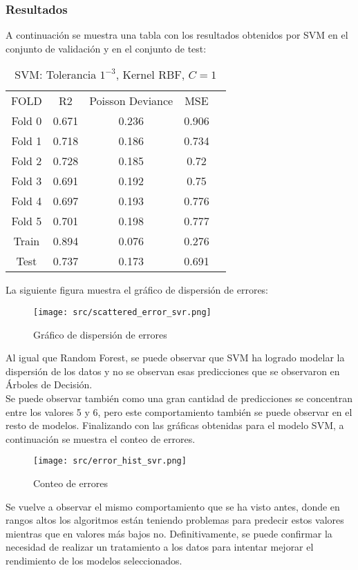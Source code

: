 \subsubsection*{Resultados}
A continuación se muestra una tabla con los resultados obtenidos por SVM en el conjunto de validación y en el conjunto de test:
\begin{table}[H]
	\centering
	\begin{tabular}{|c|c|c|c|c}
		\cline{1-4}
		FOLD   & R2    & Poisson Deviance & MSE   \\ \cline{1-4}
		Fold 0 & 0.671 & 0.236            & 0.906 \\ \cline{1-4}
		Fold 1 & 0.718 & 0.186            & 0.734 \\ \cline{1-4}
		Fold 2 & 0.728 & 0.185            & 0.72  \\ \cline{1-4}
		Fold 3 & 0.691 & 0.192            & 0.75  \\ \cline{1-4}
		Fold 4 & 0.697 & 0.193            & 0.776 \\ \cline{1-4}
		Fold 5 & 0.701 & 0.198            & 0.777 \\ \cline{1-4}
		Train  & 0.894 & 0.076            & 0.276 \\ \cline{1-4}
		Test   & 0.737 & 0.173            & 0.691 \\ \cline{1-4}
	\end{tabular}
	\caption{SVM: Tolerancia $1^{-3}$, Kernel RBF, $C=1$}
	\label{tab:svm_res}
\end{table}
\clearpage
La siguiente figura muestra el gráfico de dispersión de errores:
\begin{figure}[H]
	\centering
	\texttt{[image: src/scattered\_error\_svr.png]}
	\caption{Gráfico de dispersión de errores}
	\label{fig:svr_scattered}
\end{figure}
Al igual que Random Forest, se puede observar que SVM ha logrado modelar la dispersión de los datos y no se observan esas predicciones que se observaron en Árboles de Decisión.\\
Se puede observar también como una gran cantidad de predicciones se concentran entre los valores 5 y 6, pero este comportamiento también se puede observar en el resto de modelos. 
\clearpage
Finalizando con las gráficas obtenidas para el modelo SVM, a continuación se muestra el conteo de errores.
\begin{figure}[H]
	\centering
	\texttt{[image: src/error\_hist\_svr.png]}
	\caption{Conteo de errores}
	\label{fig:svr_error_plot}
\end{figure}
Se vuelve a observar el mismo comportamiento que se ha visto antes, donde en rangos altos los algoritmos están teniendo problemas para predecir estos valores mientras que en valores más bajos no. Definitivamente, se puede confirmar la necesidad de realizar un tratamiento a los datos para intentar mejorar el rendimiento de los modelos seleccionados.
\clearpage
